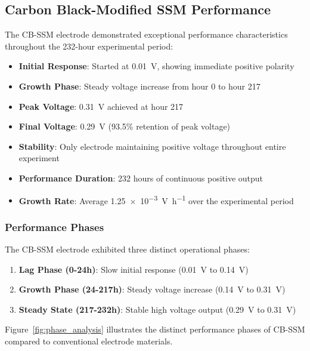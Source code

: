\documentclass[12pt,a4paper]{article}
\begin{document}
\subsection{Carbon Black-Modified SSM Performance}

The CB-SSM electrode demonstrated exceptional performance characteristics throughout the 232-hour experimental period:

\begin{itemize}
    \item \textbf{Initial Response}: Started at \SI{+0.01}{\volt}, showing immediate positive polarity
    \item \textbf{Growth Phase}: Steady voltage increase from hour 0 to hour 217
    \item \textbf{Peak Voltage}: \SI{+0.31}{\volt} achieved at hour 217
    \item \textbf{Final Voltage}: \SI{+0.29}{\volt} (93.5\% retention of peak voltage)
    \item \textbf{Stability}: Only electrode maintaining positive voltage throughout entire experiment
    \item \textbf{Performance Duration}: 232 hours of continuous positive output
    \item \textbf{Growth Rate}: Average \SI{1.25e-3}{\volt\per\hour} over the experimental period
\end{itemize}

\subsubsection{Performance Phases}

The CB-SSM electrode exhibited three distinct operational phases:

\begin{enumerate}
    \item \textbf{Lag Phase (0-24h)}: Slow initial response (\SI{0.01}{\volt} to \SI{0.14}{\volt})
    \item \textbf{Growth Phase (24-217h)}: Steady voltage increase (\SI{0.14}{\volt} to \SI{0.31}{\volt})
    \item \textbf{Steady State (217-232h)}: Stable high voltage output (\SI{0.29}{\volt} to \SI{0.31}{\volt})
\end{enumerate}

Figure~\ref{fig:phase_analysis} illustrates the distinct performance phases of CB-SSM compared to conventional electrode materials.
\end{document}
